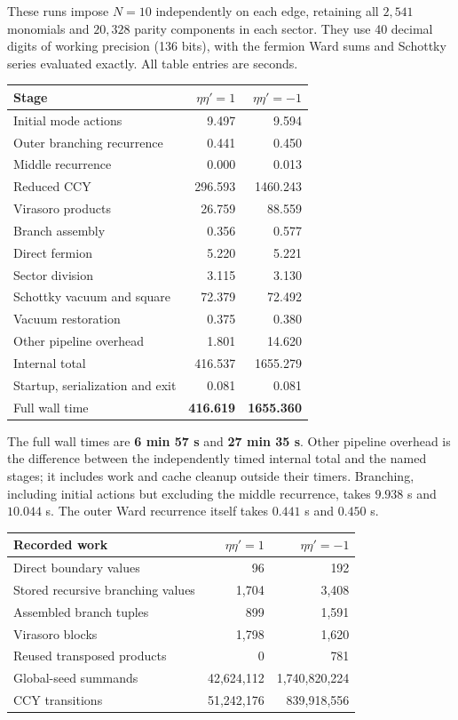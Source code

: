 These runs impose $N=10$ independently on each edge, retaining all
$2{,}541$ monomials and $20{,}328$ parity components in each sector.
They use 40 decimal digits of working precision (136 bits), with the
fermion Ward sums and Schottky series evaluated exactly. All table entries are seconds.
\begin{center}\small
\begin{tabular}{@{}lrr@{}}
\toprule
Stage & $\eta\eta'=1$ & $\eta\eta'=-1$\\
\midrule
Initial mode actions & 9.497 & 9.594\\
Outer branching recurrence & 0.441 & 0.450\\
Middle recurrence & 0.000 & 0.013\\
Reduced CCY & 296.593 & 1460.243\\
Virasoro products & 26.759 & 88.559\\
Branch assembly & 0.356 & 0.577\\
Direct fermion & 5.220 & 5.221\\
Sector division & 3.115 & 3.130\\
Schottky vacuum and square & 72.379 & 72.492\\
Vacuum restoration & 0.375 & 0.380\\
Other pipeline overhead & 1.801 & 14.620\\
Internal total & 416.537 & 1655.279\\
Startup, serialization and exit & 0.081 & 0.081\\
\midrule
Full wall time & \textbf{416.619} & \textbf{1655.360}\\
\bottomrule
\end{tabular}
\end{center}
The full wall times are \textbf{6 min 57 s} and \textbf{27 min 35 s}.
Other pipeline overhead is the difference between the independently timed
internal total and the named stages; it includes work and cache cleanup
outside their timers. Branching, including initial actions but excluding
the middle recurrence, takes $9.938$ s and $10.044$ s. The outer Ward
recurrence itself takes $0.441$ s and $0.450$ s.
\begin{center}\small
\begin{tabular}{@{}lrr@{}}
\toprule
Recorded work & $\eta\eta'=1$ & $\eta\eta'=-1$\\
\midrule
Direct boundary values & 96 & 192\\
Stored recursive branching values & 1,704 & 3,408\\
Assembled branch tuples & 899 & 1,591\\
Virasoro blocks & 1,798 & 1,620\\
Reused transposed products & 0 & 781\\
Global-seed summands & 42,624,112 & 1,740,820,224\\
CCY transitions & 51,242,176 & 839,918,556\\
\bottomrule
\end{tabular}
\end{center}
